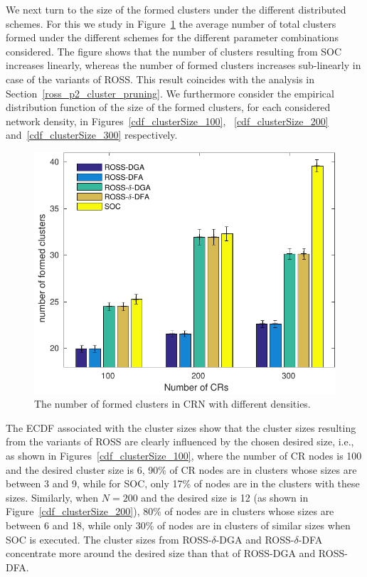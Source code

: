 \documentclass[times]{ettauth}
\newcommand{\ie}{i.e., }
\theoremstyle{mytheoremstyle}
\theoremstyle{mytheoremstyle}
\theoremstyle{mytheoremstyle}
\begin{document}
We next turn to the size of the formed clusters under the different distributed schemes.
For this we study in Figure~\ref{nClusters_largeNetwork} the average number of total clusters formed under the different schemes for the different parameter combinations considered.
The figure shows that the number of clusters resulting from SOC increases linearly, whereas the number of formed clusters increases sub-linearly in case of the variants of ROSS.
This result coincides with the analysis in Section~\ref{ross_p2_cluster_pruning}.
We furthermore consider the empirical distribution function of the size of the formed clusters, for each considered network density, in Figures~\ref{cdf_clusterSize_100}, ~\ref{cdf_clusterSize_200} and~\ref{cdf_clusterSize_300} respectively.
\begin{figure}[!h]
  \centering
   \includegraphics[width=0.7\linewidth]{nClusters_largeNetwork_no_texture.pdf}
  \caption{The number of formed clusters in CRN with different densities.}
  \label{nClusters_largeNetwork}
\end{figure}

The ECDF associated with the cluster sizes show that the cluster sizes resulting from the variants of ROSS are clearly influenced by the chosen desired size, \ie as shown in Figures~\ref{cdf_clusterSize_100}, where the number of CR nodes is 100 and the desired cluster size is 6, 90\% of CR nodes are in clusters whose sizes are between 3 and 9, while for SOC, only 17\% of nodes are in the clusters with these sizes.
Similarly, when $N=200$ and the desired size is 12 (as shown in Figure~\ref{cdf_clusterSize_200}), 80\% of nodes are in clusters whose sizes are between 6 and 18, while only 30\% of nodes are in clusters of similar sizes when SOC is executed.
The cluster sizes from ROSS-$\delta$-DGA and ROSS-$\delta$-DFA concentrate more around the desired size than that of ROSS-DGA and ROSS-DFA.
\end{document}
